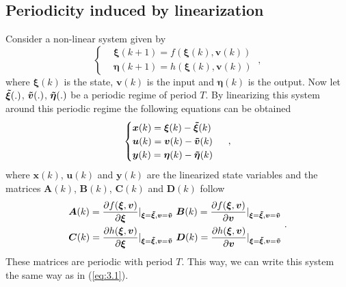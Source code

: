 \subsection{Periodicity induced by linearization} \label{linearization}
Consider a non-linear system given by
\begin{equation} \label{eq:3.2}
\begin{cases}
      &\boldsymbol{\xi}(k+1)=f(\boldsymbol{\xi}(k), \boldsymbol{v}(k))\\
      &\boldsymbol{\eta}(k+1)=h(\boldsymbol{\xi}(k), \boldsymbol{v}(k))
\end{cases} \ ,
\end{equation}
where $\boldsymbol{\xi}(k)$ is the state, $\boldsymbol{v}(k)$ is the input and $\boldsymbol{\eta}(k)$ is the output.
Now let $\boldsymbol{\Tilde{\xi}}(.)$, $\boldsymbol{\Tilde{v}}(.)$, $\boldsymbol{\Tilde{\eta}}(.)$ be a periodic regime of period $T$. By linearizing this system around this periodic regime the following equations can be obtained
\begin{equation} \label{eq:3.3} 
    \begin{cases}
      \boldsymbol{x}(k)=\boldsymbol{\xi}(k)-\boldsymbol{\Tilde{\xi}}(k)\\
      \boldsymbol{u}(k)=\boldsymbol{v}(k)-\boldsymbol{\Tilde{v}}(k)\\
      \boldsymbol{y}(k)=\boldsymbol{\eta}(k)-\boldsymbol{\Tilde{\eta}}(k)
    \end{cases} \ ,  
\end{equation}
where $\boldsymbol{x}(k)$, $\boldsymbol{u}(k)$ and $\boldsymbol{y}(k)$ are the linearized state variables and the matrices $\boldsymbol{A}(k)$, $\boldsymbol{B}(k)$, $\boldsymbol{C}(k)$ and $\boldsymbol{D}(k)$ follow
\begin{equation} \label{eq:3.4}
\begin{split}
      &\boldsymbol{A}(k)=\frac{\partial f(\boldsymbol{\xi},\boldsymbol{v})}{\partial \boldsymbol{\xi}}|_{\boldsymbol{\xi}=\boldsymbol{\Tilde{\xi}},\boldsymbol{v}=\boldsymbol{\Tilde{v}}}\ 
      \boldsymbol{B}(k)=\frac{\partial f(\boldsymbol{\xi},\boldsymbol{v})}{\partial \boldsymbol{v}}|_{\boldsymbol{\xi}=\boldsymbol{\Tilde{\xi}},\boldsymbol{v}=\boldsymbol{\Tilde{v}}}\\
      &\boldsymbol{C}(k)=\frac{\partial h(\boldsymbol{\xi},\boldsymbol{v})}{\partial \boldsymbol{\xi}}|_{\boldsymbol{\xi}=\boldsymbol{\Tilde{\xi}},\boldsymbol{v}=\boldsymbol{\Tilde{v}}} \
      \boldsymbol{D}(k)=\frac{\partial h(\boldsymbol{\xi},\boldsymbol{v})}{\partial \boldsymbol{v}}|_{\boldsymbol{\xi}=\boldsymbol{\Tilde{\xi}},\boldsymbol{v}=\boldsymbol{\Tilde{v}}}
\end{split} \ .
\end{equation}
These matrices are periodic with period $T$. This way, we can write this system the same way as in (\ref{eq:3.1}).

